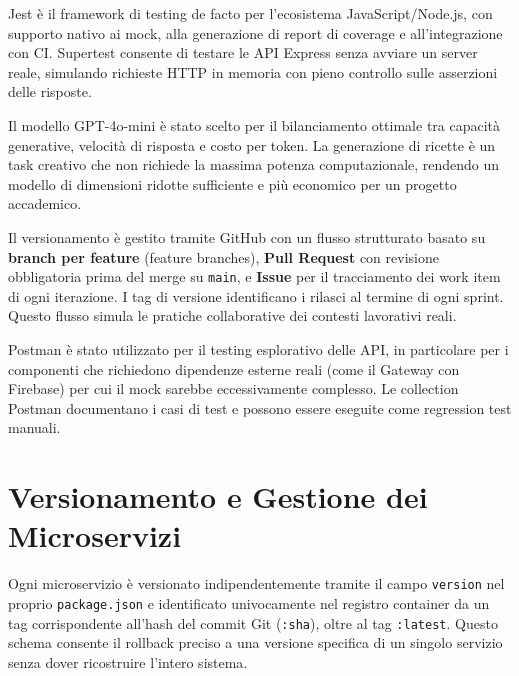 \documentclass[12pt,a4paper,twoside]{report}
\newenvironment{toollist}{%
  \begin{description}[
    style=nextline,
    leftmargin=0pt,
    labelindent=0pt,
    font=\normalfont\bfseries,
    itemsep=6pt
  ]
}{%
  \end{description}
}
\begin{document}
\begin{toollist}
  \item[Jest e Supertest (Analisi Dinamica)]
    Jest è il framework di testing de facto per l'ecosistema JavaScript/Node.js, con supporto nativo ai mock, alla generazione di report di coverage e all'integrazione con CI. Supertest consente di testare le API Express senza avviare un server reale, simulando richieste HTTP in memoria con pieno controllo sulle asserzioni delle risposte.

  \item[OpenAI GPT-4o-mini (Generazione Ricette)]
    Il modello GPT-4o-mini è stato scelto per il bilanciamento ottimale tra capacità generative, velocità di risposta e costo per token. La generazione di ricette è un task creativo che non richiede la massima potenza computazionale, rendendo un modello di dimensioni ridotte sufficiente e più economico per un progetto accademico.

  \item[GitHub (Versionamento)]
    Il versionamento è gestito tramite GitHub con un flusso strutturato basato su \textbf{branch per feature} (feature branches), \textbf{Pull Request} con revisione obbligatoria prima del merge su \texttt{main}, e \textbf{Issue} per il tracciamento dei work item di ogni iterazione. I tag di versione identificano i rilasci al termine di ogni sprint. Questo flusso simula le pratiche collaborative dei contesti lavorativi reali.

  \item[Postman (Test API Manuali)]
    Postman è stato utilizzato per il testing esplorativo delle API, in particolare per i componenti che richiedono dipendenze esterne reali (come il Gateway con Firebase) per cui il mock sarebbe eccessivamente complesso. Le collection Postman documentano i casi di test e possono essere eseguite come regression test manuali.
\end{toollist}

\section{Versionamento e Gestione dei Microservizi}

Ogni microservizio è versionato indipendentemente tramite il campo \texttt{version} nel proprio \texttt{package.json} e identificato univocamente nel registro container da un tag corrispondente all'hash del commit Git (\texttt{:sha}), oltre al tag \texttt{:latest}. Questo schema consente il rollback preciso a una versione specifica di un singolo servizio senza dover ricostruire l'intero sistema.
\end{document}
